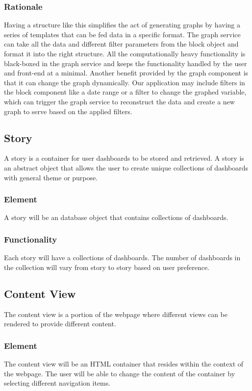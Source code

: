 \documentclass[journal,10pt,onecolumn,compsoc]{IEEEtran}
\begin{document}
			\subsubsection{Rationale}
				Having a structure like this simplifies the act of generating graphs by having a series of templates that can be fed data in a specific format. 
				The graph service can take all the data and different filter parameters from the block object and format it into the right structure. 
				All the computationally heavy functionality is black-boxed in the graph service and keeps the functionality handled by the user and front-end at a minimal. 
				Another benefit provided by the graph component is that it can change the graph dynamically. 
				Our application may include filters in the block component like a date range or a filter to change the graphed variable, which can trigger the graph service to reconstruct the data and create a new graph to serve based on the applied filters.
		
			\subsection{Story}
			A story is a container for user dashboards to be stored and retrieved. A story is an abstract object that allows the user to create unique collections of dashboards with general theme or purpose.
			\subsubsection{Element}
				A story will be an database object that contains collections of dashboards.
			\subsubsection{Functionality}
				Each story will have a collections of dashboards. The number of dashboards in the collection will vary from story to story based on user preference.
		
		\subsection{Content View}
			The content view is a portion of the webpage where different views can be rendered to provide different content.
			\subsubsection{Element} 
				The content view will be an HTML container that resides within the context of the webpage. The user will be able to change the content of the container by selecting different navigation items.
\end{document}
